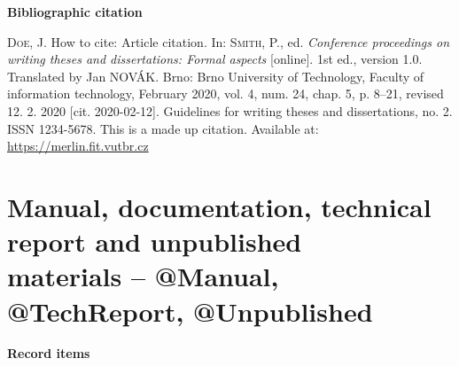 \bigskip

\noindent \textbf{Bibliographic citation}

\medskip

\noindent \textsc{Doe}, J. How to cite: Article citation.
In: \textsc{Smith}, P., ed. \textit{Conference proceedings on writing theses and dissertations: Formal aspects} [online]. 1st ed., version 1.0. Translated by Jan NOVÁK. Brno: Brno University of Technology, Faculty of information technology, February 2020, vol. 4, num. 24, chap. 5, p. 8–21, revised 12. 2. 2020 [cit. 2020-02-12]. Guidelines for writing theses and dissertations, no. 2. ISSN 1234-5678. This is a made up citation. Available at: \url{https://merlin.fit.vutbr.cz}
\newpage
\section*{Manual, documentation, technical report and unpublished \\materials -- @Manual, @TechReport, @Unpublished}
\label{pr-manual}
\noindent \textbf{Record items}

\medskip

